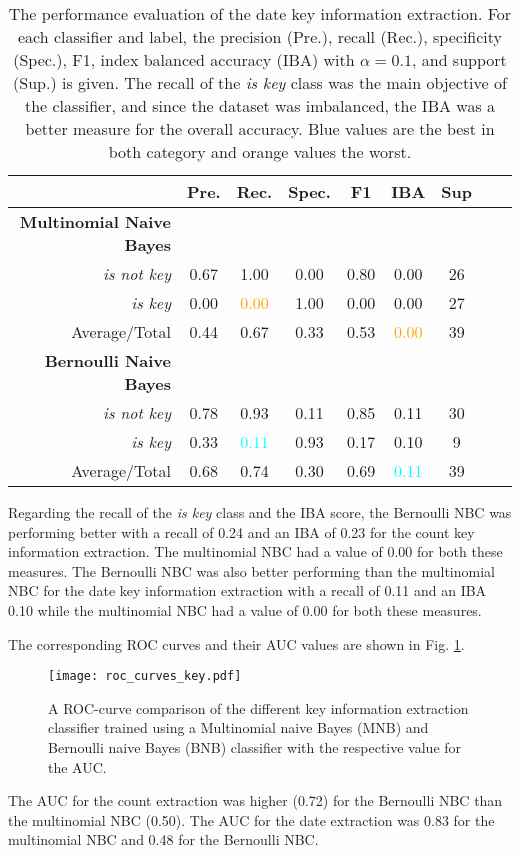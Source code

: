   \begin{table}[h!]
    \caption{The performance evaluation of the date key information extraction. For each classifier and label, the precision (Pre.), recall (Rec.), specificity (Spec.), F1, index balanced accuracy (IBA) with $\alpha = 0.1$, and support (Sup.) is given. The recall of the \textsl{is key} class was the main objective of the classifier, and since the dataset was imbalanced, the IBA was a better measure for the overall accuracy. Blue values are the best in both category and orange values the worst.}
    \centering
    \begin{tabular}{@{}rcccccccc@{}}
      \toprule
       & \textbf{Pre.} & \textbf{Rec.} & \textbf{Spec.}
      & \textbf{F1} &  \textbf{IBA}& \textbf{Sup} \\
      \midrule
      \textbf{Multinomial Naive Bayes}\\
      \textsl{is not key}& 0.67& 1.00&  0.00& 0.80& 0.00& 26 \\
      \textsl{is key}& 0.00& \textcolor{orange}{0.00}&  1.00& 0.00& 0.00& 27 \\
      Average/Total& 0.44& 0.67& 0.33& 0.53& \textcolor{orange}{0.00}& 39 \vspace{2mm}\\
      \textbf{Bernoulli Naive Bayes}\\
      \textsl{is not key}& 0.78& 0.93&  0.11& 0.85& 0.11& 30 \\
      \textsl{is key}& 0.33& \textcolor{cyan}{0.11}&  0.93& 0.17& 0.10& 9 \\
      Average/Total& 0.68& 0.74& 0.30& 0.69& \textcolor{cyan}{0.11}& 39 \vspace{2mm}\\
      \bottomrule
    \end{tabular}
  \label{table:keyword_performance_dates}
  \end{table}
  Regarding the recall of the \textsl{is key} class and the IBA score, the Bernoulli NBC was performing better with a recall of 0.24 and an IBA of 0.23 for the count key information extraction. The multinomial NBC had a value of 0.00 for both these measures.
  The Bernoulli NBC was also better performing than the multinomial NBC for the date key information extraction with a recall of 0.11 and an IBA 0.10 while the multinomial NBC had a value of 0.00 for both these measures.

  The corresponding ROC curves and their AUC values are shown in Fig. \ref{fig:roc_key}.
  \begin{figure}[h!]
    \centering
    \texttt{[image: roc\_curves\_key.pdf]}
    \caption{A ROC-curve comparison of the different key information extraction classifier trained using a Multinomial naive Bayes (MNB) and Bernoulli naive Bayes (BNB) classifier with the respective value for the AUC.}
  \label{fig:roc_key}
  \end{figure}
  The AUC for the count extraction was higher (0.72) for the Bernoulli NBC than the multinomial NBC (0.50).
  The AUC for the date extraction was 0.83 for the multinomial NBC and 0.48 for the Bernoulli NBC.

